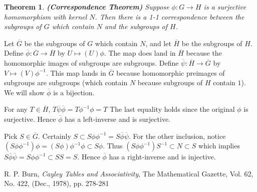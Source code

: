 \documentclass[letter]{article}
\newtheorem{theorem}{Theorem}[section]
\newenvironment{proof}[1][Proof]{\begin{trivlist}
\item[\hskip \labelsep {\bfseries #1}]}{\end{trivlist}}
\begin{document}
\begin{theorem}
\emph{\textbf{(Correspondence Theorem)}}
Suppose $\phi \colon G \rightarrow H$ is a surjective homomorphism with kernel $N$. Then there is a 1-1 correspondence between the subgroups of $G$ which contain $N$ and the subgroups of $H$.
\end{theorem}
\begin{proof}
Let $\overline G$ be the subgroups of $G$ which contain $N$, and let $\overline H$ be the subgroups of $H$. Define $\overline \phi \colon \overline G \rightarrow \overline H$ by $U \mapsto (U)\phi$. The map does land in $\overline H$ because the homomorphic images of subgroups are subgroups. Define $\overline \psi \colon \overline H \rightarrow \overline G$ by $V \mapsto (V)\phi^{-1}$. This map lands in $\overline G$ because homomorphic preimages of subgroups are subgroups (which contain $N$ because subgroups of $H$ contain $1$). We will show $\overline \phi$ is a bijection.

For any $T \in \overline H$, $T\overline\psi \overline\phi = T\phi^{-1}\phi = T$ The last equality holds since the original $\phi$ is surjective. Hence $\overline\phi$ has a left-inverse and is surjective.

Pick $S \in \overline G$.  Certainly $S \subset S\phi\phi^{-1} = S\overline\phi \overline\psi$. For the other inclusion, notice $(S\phi\phi^{-1})\phi = (S\phi)\phi^{-1}\phi \subset S\phi$. Thus $(S\phi\phi^{-1})S^{-1} \subset N \subset S$ which implies $S\overline\phi \overline\psi = S\phi\phi^{-1} \subset SS = S$. Hence $\overline\phi$ has a right-inverse and is injective.
\end{proof}


\begin{thebibliography}{7}
 R. P. Burn, \emph{Cayley Tables and Associativity},
The Mathematical Gazette, Vol. 62, No. 422, (Dec., 1978), pp. 278-281
\end{thebibliography}
\end{document}

